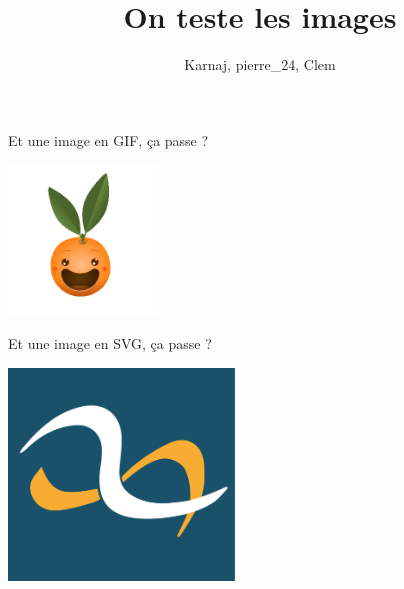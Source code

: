 \documentclass[small]{zmdocument}
\title{On teste les images}
\author{Karnaj, pierre\_24, Clem}
\begin{document}
\maketitle
\tableofcontents

\levelOneIntroduction


Et une image en GIF, ça passe ?

\begin{center}
\includegraphics[width=4cm]{test-images/image_in_gif.gif}
\end{center}

Et une image en SVG, ça passe ?

\begin{center}
\includegraphics[width=6cm]{test-images/image_in_svg.svg}
\end{center}
\end{document}
